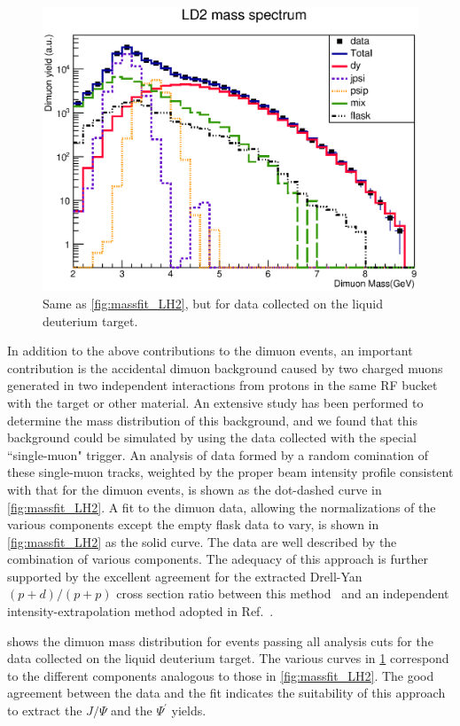 \documentclass[reprint,aps,unsortedaddress,superscriptaddress,prd,floatfix,showpacs,linenumbers]{revtex4-2}
\begin{document}
\begin{figure}
	\includegraphics[width=\linewidth]{massFit/LD2_massfit}
	\caption{Same as \cref{fig:massfit_LH2}, but for data collected on the liquid
		deuterium target.}
	\label{fig:massfit_LD2}
\end{figure}

In addition to the above contributions to the dimuon events, an important
contribution is the accidental dimuon background caused by two charged
muons generated in two independent interactions from protons in the same
RF bucket with the target or other material. An extensive
study has been performed to determine the mass distribution of this background,
and we found that this background could be simulated by using
the data collected with the special ``single-muon" trigger. An analysis
of data formed by a random
comination of these single-muon tracks, weighted by the proper beam intensity
profile consistent with that for the dimuon events, is shown as the dot-dashed
curve in \cref{fig:massfit_LH2}. A fit to the dimuon data, allowing the normalizations of
the various components except the empty flask data to vary, is shown in \cref{fig:massfit_LH2}
as the solid curve. The data are well described by the combination of various
components. The adequacy of this approach is further supported by the excellent
agreement for the extracted Drell-Yan $(p+d) / (p+p)$ cross section ratio
between this method~\cite{dove2023} and an independent intensity-extrapolation
method adopted in Ref.~\cite{dove2021}.

 shows the dimuon mass distribution for events passing all analysis
cuts for the data collected on the liquid deuterium target. The various curves
in \cref{fig:massfit_LD2} correspond to the different components analogous to those in \cref{fig:massfit_LH2}.
The good agreement between the data and the fit indicates the suitability of
this approach to extract the $J/\Psi$ and the $\Psi^\prime$ yields.
\end{document}
